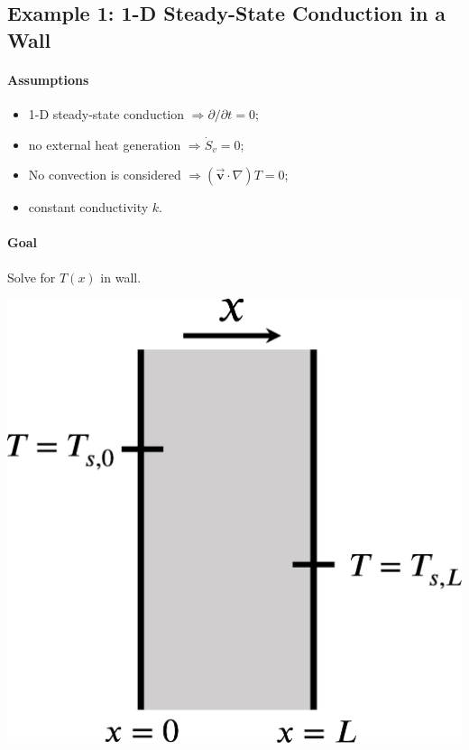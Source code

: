 \documentclass[12pt, a4paper]{article}
\numberwithin{equation}{subsection}
\begin{document}
\subsection{Example 1: 1-D Steady-State Conduction in a Wall}
\begin{tcolorbox}[breakable, title = \textbf{Example: 1-D Steady-State Conduction}]
\begin{minipage}{.6\textwidth}
    \paragraph{Assumptions} 
    \begin{itemize}
        \item 1-D steady-state conduction $\Rightarrow \partial / \partial t = 0$;
        \item no external heat generation $ \Rightarrow \dot{S}_{v} = 0$;
        \item No convection is considered $\Rightarrow (\vec{\bm{v}} \cdot \nabla) T = 0$;
        \item constant conductivity $k$.
\end{itemize}
\paragraph{Goal} Solve for $T(x)$ in wall.
\end{minipage}
\hfill
\begin{minipage}{.35\textwidth}
    \includegraphics[width=.9\textwidth]{img/oneD_conduction_wall.eps}
\end{minipage}
\ \\

\end{tcolorbox}
\end{document}
